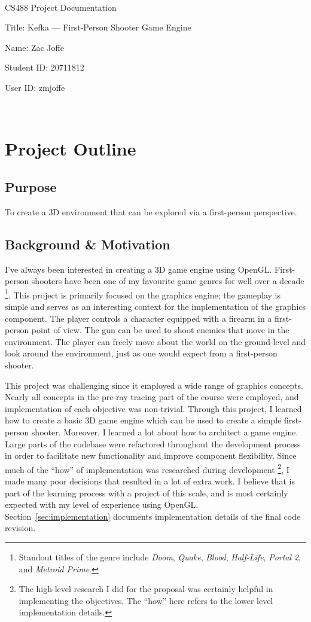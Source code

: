 \documentclass {article}
\begin{document}
~\vfill
\begin{center}
\Large

CS488 Project Documentation

Title: Kefka --- First-Person Shooter Game Engine

Name: Zac Joffe

Student ID: 20711812

User ID: zmjoffe

\end{center}
\vfill ~\vfill~

\newpage
\tableofcontents

\newpage
\section{Project Outline}
\subsection{Purpose}
To create a 3D environment that can be explored via a first-person perspective.

\subsection{Background \& Motivation}\label{sec:background}
I've always been interested in creating a 3D game engine using OpenGL. First-person shooters have been one of my favourite game genres for well over a decade \footnote{Standout titles of the genre include \textit{Doom}, \textit{Quake}, \textit{Blood}, \textit{Half-Life}, \textit{Portal 2}, and \textit{Metroid Prime}.}. This project is primarily focused on the graphics engine; the gameplay is simple and serves as an interesting context for the implementation of the graphics component. The player controls a character equipped with a firearm in a first-person point of view. The gun can be used to shoot enemies that move in the environment. The player can freely move about the world on the ground-level and look around the environment, just as one would expect from a first-person shooter.

This project was challenging since it employed a wide range of graphics concepts. Nearly all concepts in the pre-ray tracing part of the course were employed, and implementation of each objective was non-trivial. Through this project, I learned how to create a basic 3D game engine which can be used to create a simple first-person shooter. Moreover, I learned a lot about how to architect a game engine. Large parts of the codebase were refactored throughout the development process in order to facilitate new functionality and improve component flexibility. Since much of the ``how'' of implementation was researched during development \footnote{The high-level research I did for the proposal was certainly helpful in implementing the objectives. The ``how'' here refers to the lower level implementation details.}, I made many poor decisions that resulted in a lot of extra work. I believe that is part of the learning process with a project of this scale, and is most certainly expected with my level of experience using OpenGL. Section~\ref{sec:implementation} documents implementation details of the final code revision.
\end{document}
